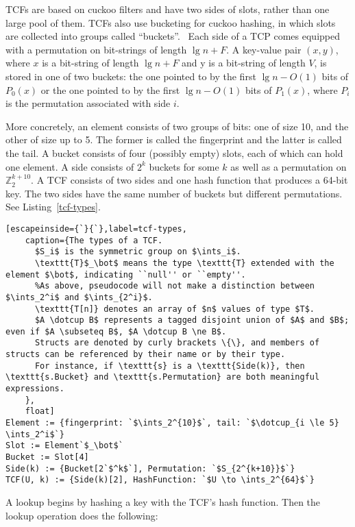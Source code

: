 \documentclass[sigconf, nonacm]{acmart}
\newcommand{\ints}{\mathbb{Z}}
\newcommand{\dotcup}{\ensuremath{\mathaccent\cdot\cup}}
\begin{document}
TCFs are based on cuckoo filters and have two sides of slots, rather than one large pool of them.
TCFs also use bucketing for cuckoo hashing, in which slots are collected into groups called ``buckets''.~\cite{buckets}
Each side of a TCP comes equipped with a permutation on bit-strings of length $\lg n + F$.
A key-value pair $(x, y)$, where $x$ is a bit-string of length $\lg n + F$ and y is a bit-string of length $V$, is stored in one of two buckets: the one pointed to by the first $\lg n - O(1)$ bits of $P_0(x)$ or the one pointed to by the first $\lg n - O(1)$ bits of $P_1(x)$, where $P_i$ is the permutation associated with side $i$.

More concretely, an element consists of two groups of bits: one of size 10, and the other of size up to 5.
The former is called the fingerprint and the latter is called the tail.
A bucket consists of four (possibly empty) slots, each of which can hold one element.
A side consists of $2^k$ buckets for some $k$ as well as a permutation on $\ints_2^{k+10}$. %
A TCF consists of two sides and one hash function that produces a 64-bit key.
The two sides have the same number of buckets but different permutations.
See Listing~\ref{tcf-types}.

\begin{lstlisting}[escapeinside={`}{`},label=tcf-types,
    caption={The types of a TCF.
      $S_i$ is the symmetric group on $\ints_i$.
      \texttt{T}$_\bot$ means the type \texttt{T} extended with the element $\bot$, indicating ``null'' or ``empty''.
      %As above, pseudocode will not make a distinction between $\ints_2^i$ and $\ints_{2^i}$.
      \texttt{T[n]} denotes an array of $n$ values of type $T$.
      $A \dotcup B$ represents a tagged disjoint union of $A$ and $B$; even if $A \subseteq B$, $A \dotcup B \ne B$.
      Structs are denoted by curly brackets \{\}, and members of structs can be referenced by their name or by their type.
      For instance, if \texttt{s} is a \texttt{Side(k)}, then \texttt{s.Bucket} and \texttt{s.Permutation} are both meaningful expressions.
    },
    float]
Element := {fingerprint: `$\ints_2^{10}$`, tail: `$\dotcup_{i \le 5} \ints_2^i$`}
Slot := Element`$_\bot$`
Bucket := Slot[4]
Side(k) := {Bucket[2`$^k$`], Permutation: `$S_{2^{k+10}}$`}
TCF(U, k) := {Side(k)[2], HashFunction: `$U \to \ints_2^{64}$`}
\end{lstlisting}

A lookup begins by hashing a key with the TCF's hash function.
Then the lookup operation does the following:
\end{document}
